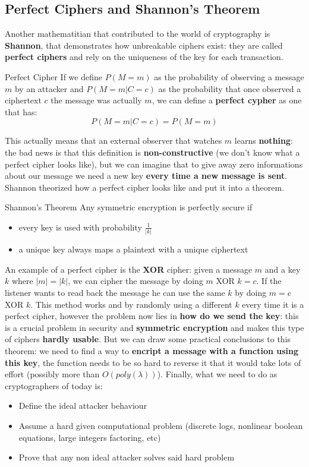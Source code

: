 \subsection{Perfect Ciphers and Shannon's Theorem}
Another mathematitian that contributed to the world of cryptography is 
\textbf{Shannon}, that demonstrates how unbreakable ciphers exist: 
they are called \textbf{perfect ciphers} and rely on the uniqueness of the
key for each transaction. 
\begin{key}{Perfect Cipher}
    If we define $P(M=m)$ as the probability of observing a message $m$ by an
    attacker and $P(M=m|C=c)$ as the probability that once observed a 
    ciphertext $c$ the message was actually $m$, we can define a 
    \textbf{perfect cypher} as one that has:
    \begin{equation}
        P(M=m|C=c) = P(M=m)
    \end{equation}
\end{key}
This actually means that an external observer that watches $m$ learns 
\textbf{nothing}: the bad news is that this definition is 
\textbf{non-constructive} (we don't know what a perfect cipher looks like), 
but we can imagine that to give away zero informations about our message
we need a new key \textbf{every time a new message is sent}. Shannon theorized
how a perfect cipher looks like and put it into a theorem.
\begin{key}{Shannon's Theorem}
    Any symmetric encryption is perfectly secure if
    \begin{itemize}
        \item every key is used with probability $\frac{1}{|k|}$
        \item a unique key always maps a plaintext with a unique ciphertext
    \end{itemize}
\end{key}
An example of a perfect cipher is the \textbf{XOR} cipher: given a message
$m$ and a key $k$ where $|m| = |k|$, we can cipher the message by doing
$m$ XOR $k = c$. If the listener wants to read back the message he can use
the same $k$ by doing $m = c$ XOR $k$. This method works and by randomly using
a different $k$ every time it is a perfect cipher, however the problem now lies
in \textbf{how do we send the key}: this is a crucial problem in security and
\textbf{symmetric encryption} and makes this type of ciphers 
\textbf{hardly usable}. But we can draw some practical conclusions to this 
theorem: we need to find a way to \textbf{encript a message with a function 
using this key}, the function needs to be so hard to reverse it that it would 
take lots of effort (possibly more than $O(poly(\lambda))$). 
Finally, what we need to do as cryptographers of today is:
\begin{itemize}
    \item Define the ideal attacker behaviour
    \item Assume a hard given computational problem (discrete logs, nonlinear
    boolean equations, large integers factoring, etc)
    \item Prove that any non ideal attacker solves said hard problem
\end{itemize}

